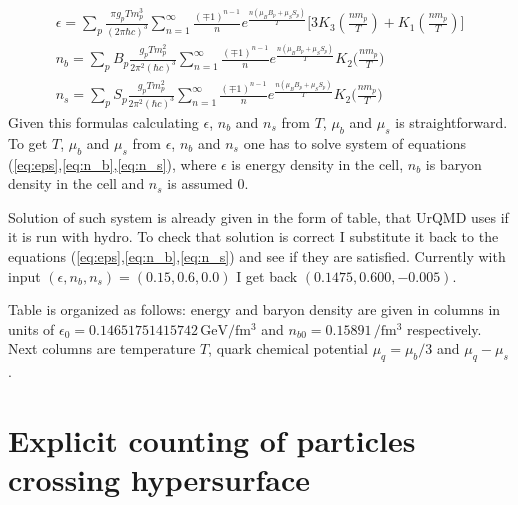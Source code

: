 \documentclass[12pt,a4paper]{report}
\begin{document}
\begin{eqnarray} 
\label{eq:eps}
\epsilon = \sum_p \frac{\pi g_p T m_p^3}{(2\pi \hbar c)^3}
                    \sum_{n=1}^{\infty} \frac{(\mp 1)^{n-1}}{n} e^{\frac{n (\mu_B B_p  + \mu_S S_p)}{T}}
                    \bigg[ 3K_3 \left(\frac{nm_p}{T}\right) + K_1\left(\frac{nm_p}{T}\right) \bigg] \\
%             
\label{eq:n_b}       
n_b = \sum_p B_p \frac{g_p  T m_p^2 }{2\pi^2 (\hbar c)^3} 
          \sum_{n=1}^{\infty} \frac{(\mp 1)^{n-1}}{n} e^{\frac{n(\mu_B B_p  + \mu_S S_p)}{T}}
          K_2 \bigg( \frac{nm_p}{T} \bigg)\\
%          
\label{eq:n_s}
n_s = \sum_p S_p \frac{g_p  T m_p^2 }{2\pi^2 (\hbar c)^3} 
          \sum_{n=1}^{\infty} \frac{(\mp 1)^{n-1}}{n} e^{\frac{n (\mu_B B_p  + \mu_S S_p)}{T}} 
          K_2 \bigg( \frac{nm_p}{T} \bigg)
\end{eqnarray}
Given this formulas calculating $\epsilon$, $n_b$ and $n_s$ from $T$, $\mu_b$ and $\mu_s$ is straightforward. To get $T$, $\mu_b$ and $\mu_s$ from $\epsilon$, $n_b$ and $n_s$ one has to solve system of equations (\ref{eq:eps},\ref{eq:n_b},\ref{eq:n_s}), where $\epsilon$ is energy density in the cell, $n_b$ is baryon density in the cell and $n_s$ is assumed 0. 

Solution of such system is already given in the form of table, that UrQMD uses if it is run with hydro.
To check that solution is correct I substitute it back to the equations (\ref{eq:eps},\ref{eq:n_b},\ref{eq:n_s}) and see if they are satisfied. Currently with input $(\epsilon,n_b,n_s) = (0.15, 0.6, 0.0)$ I get back $(0.1475, 0.600, -0.005)$.

Table is organized as follows: energy and baryon density are given in columns in units of $\epsilon_0 = 0.14651751415742 \, \si{\giga\electronvolt\per\femto\meter\cubed}$ and $n_{b0} = 0.15891 \, \si{\per\femto\meter\cubed}$ respectively. Next columns are temperature $T$, quark chemical potential $\mu_q = \mu_b/3$ and $\mu_q - \mu_s$.

\section{Explicit counting of particles crossing hypersurface}
\end{document}
